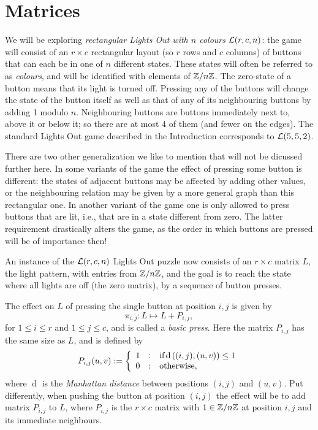 \section{Matrices}\label{sec:def}
We will be exploring {\it rectangular Lights Out with
$n$ colours} $\mathcal{L}(r, c, n)$: the game will consist of an $r\times c$ rectangular
layout (so $r$ rows and $c$ columns) of buttons that can each be
in one of $n$ different states. These states will often be referred to
as {\it colours}, and will be identified with elements
of $\mathbb{Z}/n\mathbb{Z}$. 
The zero-state of a button means that its light is turned off.
Pressing any of the buttons will change the state
of the button itself as well as that of any of its neighbouring buttons
by adding 1 modulo $n$. 
Neighbouring buttons are buttons
immediately next to, above it or below it; so there are at most 4
of them (and fewer on the edges).
The standard Lights Out game described in the Introduction
corresponds to $\mathcal{L}(5,5,2)$.

\begin{remark}
There are two other generalization we like to mention that will not be
dicussed further here. In some variants of the game the effect of pressing some
button is different: the states of adjacent buttons may be affected by adding
other values, or the neighbouring relation may be given by a more general
graph than this rectangular one. In another variant of the game one is
only allowed to press buttons that are lit, i.e., that are in a state
different from zero. The latter requirement drastically alters the
game, as the order in which buttons are pressed will be of importance then!
\end{remark}
%
An instance of the $\mathcal{L}(r, c, n)$ Lights Out puzzle now consists
of an $r\times c$ matrix $L$, the light pattern,
with entries from $\mathbb{Z}/n\mathbb{Z}$, and the goal
is to reach the state where all lights are off (the zero matrix),
by a sequence of button presses.

The effect on $L$ of pressing the single button at position $i, j$
is given by
$$\pi_{i,j}: L\mapsto L+P_{i, j},$$
for $1\leq i \leq r$ and $1\leq j \leq c$,
and is called a {\it basic press}.
Here the matrix $P_{i,j}$ has the same size as $L$, and is
defined by
\[
    P_{i,j}{(u,v)} :=
    \left\{
    \begin{array}{l@{\quad:\quad}l}
        1 & \text{if} \operatorname{d}\left((i,j), (u,v)\right) \leq 1 \\
        0 & \text{otherwise,}
    \end{array}
    \right.
\]
where $\operatorname{d}$ is the \emph{Manhattan distance} between 
positions $(i,j)$ and $(u,v)$.
Put differently, when pushing the button at position $(i, j)$ the effect will
be to add matrix $P_{i,j}$ to $L$, where $P_{i,j}$ is the $r\times c$ matrix
with $1\in\mathbb{Z}/n\mathbb{Z}$ at position $i, j$ and its immediate neighbours.

